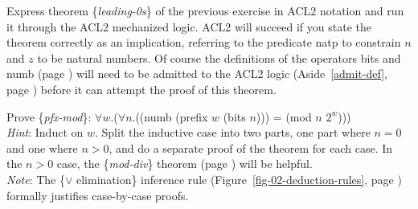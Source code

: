 \begin{ExerciseList}
\Exercise \label{leading-0s-defthm} Express theorem \{\emph{leading-0s}\}
of the previous exercise in ACL2 notation
and run it through the ACL2 mechanized logic.
ACL2 will succeed if you state the theorem correctly as an implication,
referring to the predicate natp to constrain $n$ and $z$ to be natural numbers.
Of course the definitions of the operators bits and numb (page \pageref{bits-defun}) 
will need to be admitted to the ACL2 logic (Aside~\ref{admit-def}, page \pageref{admit-def})
before it can attempt the proof of this theorem.

\Exercise \label{pfx-mod}
Prove \{\emph{pfx-mod}\}:
$\forall w$.($\forall n$.((numb (prefix $w$ (bits $n$))) = (mod $n$ $2^w$))) \\
\emph{Hint}: Induct on $w$. Split the inductive case into two parts,
one part where $n = 0$ and one where $n > 0$, and do a separate proof
of the theorem for each case.
In the $n > 0$ case, the \{\emph{mod-div}\} theorem
(page \pageref{modular-division}) will be helpful.\\
\emph{Note}: The \{$\vee$ elimination\} inference rule
(Figure~\ref{fig-02-deduction-rules}, page \pageref{fig-02-deduction-rules})
formally justifies case-by-case proofs.


\end{ExerciseList}
